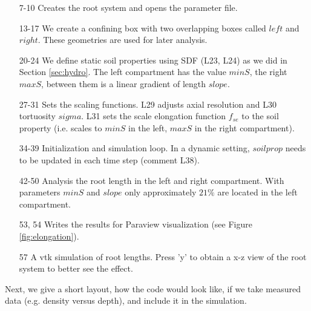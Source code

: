 \begin{itemize}

\item[7-10] Creates the root system and opens the parameter file.

\item[13-17] We create a confining box with two overlapping boxes called $left$ and $right$. These geometries are used for later analysis.

\item[20-24] We define static soil properties using SDF (L23, L24) as we did in Section \ref{sec:hydro}. 
The left compartment has the value $minS$, the right $maxS$, between them is a linear gradient of length $slope$.

\item[27-31] Sets the scaling functions. L29 adjusts axial resolution and L30 tortuosity $sigma$. L31 sets the scale elongation function $f_{se}$ to the soil property (i.e. scales to $minS$ in the left, $maxS$ in the right compartment). 

\item[34-39] Initialization and simulation loop. In a dynamic setting, $soilprop$ needs to be updated in each time step (comment L38).

\item[42-50] Analysis the root length in the left and right compartment. With parameters $minS$ and $slope$ only approximately $21\%$ are located in the left compartment.

\item[53, 54] Writes the results for Paraview visualization (see Figure \ref{fig:elongation}).

\item[57] A vtk simulation of root lengths. Press 'y' to obtain a x-z view of the root system to better see the effect. 

\end{itemize}
 
Next, we give a short layout, how the code would look like, if we take measured data (e.g. density versus depth), and include it in the simulation. 



